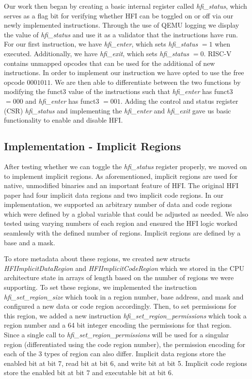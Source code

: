 \documentclass[conference,compsoc]{IEEEtran}
\begin{document}
Our work then began by creating a basic internal register called \textit{hfi\_status}, which serves as a flag bit for verifying whether HFI can be toggled on or off via our newly implemented instructions. Through the use of QEMU logging we display the value of \textit{hfi\_status} and use it as a validator that the instructions have run.
For our first instruction, we have \textit{hfi\_enter}, which sets \textit{hfi\_status} $=1$ when executed. 
Additionally, we have \textit{hfi\_exit}, which sets \textit{hfi\_status} $=0$.
RISC-V contains unmapped opcodes that can be used for the additional of new instructions.
In order to implement our instruction we have opted to use the free opcode $0001011$.
We are then able to differentiate between the two functions by modifying the funct3 value of the instructions such that \textit{hfi\_enter} has funct3 $= 000$ and \textit{hfi\_enter} has funct3 $= 001$. Adding the control and status register (CSR) \textit{hfi\_status} and implementing the \textit{hfi\_enter} and \textit{hfi\_exit} gave us basic functionality to enable and disable HFI.

\subsection{Implementation - Implicit Regions}
After testing whether we can toggle the \textit{hfi\_status} register properly, we moved on to implement implicit regions. As aforementioned, implicit regions are used for native, unmodified binaries and an important feature of HFI. The original HFI paper had four implicit data regions and two implicit code regions. In our implementation, we supported an arbitrary number of data and code regions which were defined by a global variable that could be adjusted as needed. We also tested using varying numbers of each region and ensured the HFI logic worked seamlessly with the defined number of regions. Implicit regions are defined by a base and a mask.

To store metadata about these regions, we created new structs \textit{HFIImplicitDataRegion} and \textit{HFIImplicitCodeRegion} which we stored in the CPU architecture state in arrays of length based on the number of regions we were supporting. To set these regions, we implemented the instruction \textit{hfi\_set\_region\_size} which took in a region number, base address, and mask and configured a new data or code region accordingly. Then, to set permissions for this region, we added a new instruction \textit{hfi\_set\_region\_permissions} which took a region number and a 64 bit integer encoding the permissions for that region. Since a single call to \textit{hfi\_set\_region\_permissions} will be used for a singular region (differentiated using the code region number), the permission encoding for each of the 3 types of region can also differ. Implicit data regions store the enabled bit at bit 7, read bit at bit 6, and write bit at bit 5. Implicit code regions store the enabled bit at bit 7 and executable bit at bit 6.
\end{document}
